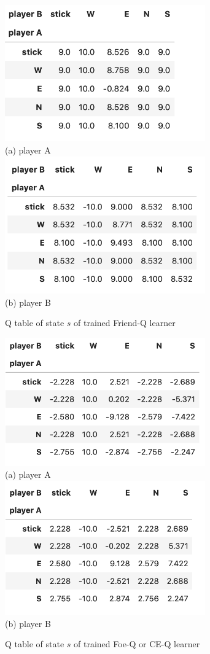 \documentclass[conference]{IEEEtran}
\begin{document}
\begin{figure}[h!]
	\centering
	\includegraphics[width=3.4in]{figures/friendQ_A.png}\\
	(a) player A\\
	\includegraphics[width=3.4in]{figures/friendQ_B.png}\\
	(b) player B
	\caption{Q table of state $s$ of trained Friend-Q learner}
	\label{fig:friendQ}
\end{figure}


\begin{figure}[h!]
	\centering
	\includegraphics[width=3.4in]{figures/foeQ_A.png}\\
	(a) player A\\
	\includegraphics[width=3.4in]{figures/foeQ_B.png}\\
	(b) player B
	\caption{Q table of state $s$ of trained Foe-Q or CE-Q learner}
	\label{fig:foe-ce-Q}
\end{figure}
\end{document}
